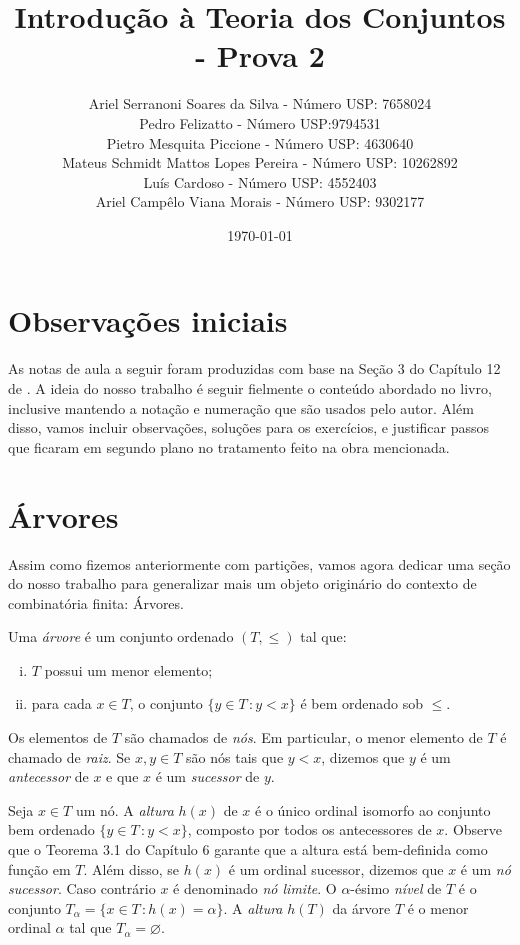 \documentclass[a4paper]{article}
\title{Introdução à Teoria dos Conjuntos - Prova 2}
\author{Ariel Serranoni Soares da Silva  - Número USP: 7658024\\
Pedro Felizatto - Número USP:9794531\\
Pietro Mesquita Piccione - Número USP: 4630640\\
Mateus Schmidt Mattos Lopes Pereira - Número USP: 10262892\\
Luís Cardoso - Número USP: 4552403\\
Ariel Campêlo Viana Morais - Número USP: 9302177}
\date{\today}
\theoremstyle{plain}\newtheorem{teo}{Teorema}[section]
\begin{document}
\maketitle
\section*{Observações iniciais}

As notas de aula a seguir foram produzidas com base na Seção 3 do Capítulo 12 de
\cite{jech}. A ideia do nosso trabalho é seguir fielmente o conteúdo abordado no
livro, inclusive mantendo a notação e numeração que são usados pelo autor.
Além disso, vamos incluir observações, soluções para os exercícios, e justificar
passos que ficaram em segundo plano no tratamento feito na obra mencionada.

\setcounter{section}{2}
\section{Árvores}

Assim como fizemos anteriormente com partições, vamos agora dedicar uma seção do
nosso trabalho para generalizar mais um objeto originário do
contexto de combinatória finita: Árvores.

\begin{definition}
  Uma \emph{árvore} é um conjunto ordenado \((T,\leq)\) tal que:
 \begin{enumerate}[(i)]
  \item \(T\) possui um menor elemento;
  \item para cada \(x\in T\), o conjunto \(\{y\in T\,\colon y<x\}\) é bem
    ordenado sob \(\leq\).
  \end{enumerate}
\end{definition}
Os elementos de \(T\) são chamados de \emph{nós}. Em particular,
o menor elemento de \(T\) é chamado  de \emph{raiz}.
Se \(x,y\in T\) são nós tais que  \(y<x\), dizemos que \(y\) é um
\emph{antecessor} de \(x\) e que \(x\) é um \emph{sucessor} de \(y\).

Seja \(x\in T\) um nó.  A \emph{altura} \(h(x)\) de \(x\) é o único ordinal
isomorfo ao conjunto bem ordenado \mbox{\(\{y\in T\,\colon
y<x\}\),} composto por todos os antecessores de \(x\). Observe que o Teorema 3.1
do Capítulo 6 garante que a altura está bem-definida como função em \(T\).
Além disso, se \(h(x)\) é um ordinal sucessor, dizemos que \(x\) é um
\emph{nó sucessor}. Caso contrário \(x\) é denominado \emph{nó limite}.
O \(\alpha\)-ésimo \emph{nível} de \(T\) é o conjunto
\(T_\alpha=\{x\in T \,\colon h(x)=\alpha\}\). A \emph{altura} \(h(T)\) da árvore
\(T\) é o menor ordinal \(\alpha\) tal que \(T_\alpha=\varnothing\).  
\end{document}
